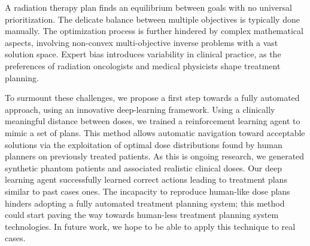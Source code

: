 A radiation therapy plan finds an equilibrium between goals with no universal prioritization. The delicate balance between multiple objectives is typically done manually.
The optimization process is further hindered by complex mathematical aspects, involving non-convex multi-objective inverse problems with a vast solution space.
Expert bias introduces variability in clinical practice, as the preferences of radiation oncologists and medical physicists shape treatment planning.

To surmount these challenges, we propose a first step towards a fully automated approach, using an innovative deep-learning framework.
Using a clinically meaningful distance between doses, we trained a reinforcement learning agent to mimic a set of plans.
This method allows automatic navigation toward acceptable solutions via the exploitation of optimal dose distributions found by human planners on previously treated patients.
As this is ongoing research, we generated synthetic phantom patients and associated realistic clinical doses.
Our deep learning agent successfully learned correct actions leading to treatment plans similar to past cases ones.
The incapacity to reproduce human-like dose plans hinders adopting a fully automated treatment planning system; this method could start paving the way towards human-less treatment planning system technologies. %
In future work, we hope to be able to apply this technique to real cases.


